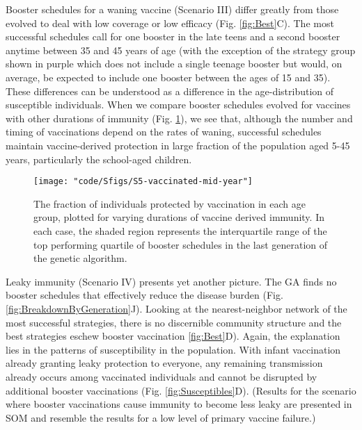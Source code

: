 \documentclass[12pt]{article}
\begin{document}
Booster schedules for a waning vaccine (Scenario III) 
differ greatly from those evolved to deal with low coverage or low efficacy (Fig. \ref{fig:Best}C).
The most successful schedules 
call for one booster in the late teens and a second booster anytime between 35 and 45 years of age
(with the exception of the strategy group shown in purple which does not include a single teenage booster
but would, on average, be expected to include one booster between the ages of 15 and 35).
These differences can be understood as a difference in the age-distribution of susceptible individuals.
When we compare booster schedules evolved for vaccines with other durations of immunity (Fig. \ref{fig:waning}),
we see that, although the number and timing of vaccinations depend on the rates of waning,
successful schedules maintain vaccine-derived protection in large fraction of the population
aged 5-45 years, particularly the school-aged children.



\begin{figure}[h!]

\texttt{[image: "code/Sfigs/S5-vaccinated-mid-year"]}


\caption{\footnotesize 
The fraction of individuals protected by vaccination in each age group,
plotted for varying durations of vaccine derived immunity.
In each case, the shaded region represents the interquartile range of the top performing
quartile of booster schedules in the last generation of the genetic algorithm.
}

\label{fig:waning}
\end{figure}

Leaky immunity (Scenario IV) presents yet another picture. 
The GA finds no booster schedules that effectively reduce the
disease burden (Fig. \ref{fig:BreakdownByGeneration}J).
Looking at the nearest-neighbor network of the most successful strategies, there is no discernible community structure
and the best strategies eschew booster vaccination \ref{fig:Best}D). Again, the explanation lies in the patterns of susceptibility
in the population. With infant vaccination already granting leaky protection to everyone, 
any remaining transmission already occurs among vaccinated individuals
and cannot be disrupted by additional booster vaccinations (Fig. \ref{fig:Susceptibles}D).
(Results for the scenario where booster vaccinations cause immunity to become less leaky are presented in SOM and
resemble the results for a low level of primary vaccine failure.)
\end{document}
